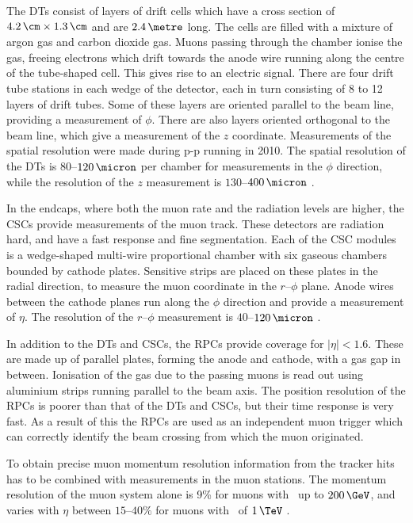 The \acp{DT} consist of layers of drift cells which have a cross section of $4.2\,\cm \times 1.3\,\cm$ and
are $2.4\,\metre$ long. The cells are filled with a mixture of %
argon gas and carbon dioxide gas.
Muons passing through the chamber ionise the gas, freeing electrons
which drift towards the anode wire running along the centre of the tube-shaped cell. 
This gives rise to an electric signal. There are four drift tube stations in each wedge of 
the detector, each in turn consisting of 8 to 12 layers of drift tubes. Some of
these layers are oriented parallel to the beam line, providing a measurement of $\phi$.
There are also layers oriented orthogonal to the beam line, which give a measurement
of the $z$ coordinate. Measurements of the spatial resolution were made
during p-p running in 2010.
The spatial resolution of the \acp{DT} is $80$--$120\,\micron$ per chamber for
measurements in the $\phi$ direction, while the resolution of the $z$ measurement
is $130$--$400\,\micron$ \cite{cms-muon-7tev}. %

In the endcaps, where both the muon rate and the radiation levels are higher, the \acp{CSC} provide
measurements of the muon track. These detectors are radiation hard,
and have a fast response and fine segmentation.
Each of the \ac{CSC} modules is a wedge-shaped
multi-wire proportional chamber %
with six gaseous chambers bounded by cathode plates. Sensitive
strips are placed on these plates in the 
radial direction, to measure the muon coordinate in the  $r$--$\phi$ plane.
Anode wires between the cathode planes
run along the $\phi$ direction and provide a measurement of
$\eta$. The resolution of the $r$--$\phi$ measurement is $40$--$120\,\micron$ \cite{cms-muon-7tev}.

In addition to the \acp{DT} and \acp{CSC}, the \acp{RPC} provide coverage
for $|\eta|<1.6$. These are made up of parallel plates, forming the anode and cathode,
with a gas gap in between. Ionisation of the gas due to the passing
muons is read out using aluminium strips running parallel to the 
beam axis. The position resolution of the \acp{RPC} is poorer than
that of the \acp{DT} and \acp{CSC}, but their time response is very fast. As
a result of this the \acp{RPC} are used as an independent muon trigger
which can correctly identify the beam crossing from which the muon
originated.

To obtain precise muon momentum resolution information from 
the tracker hits has to be combined with measurements in the
muon stations. The momentum resolution of the muon system
alone is 9\% for muons with \pT~up to $200\,\GeV$, and varies with $\eta$ 
between $15$--$40\%$ for muons with \pT~of $1\,\TeV$ \cite{cms-jinst}. %

